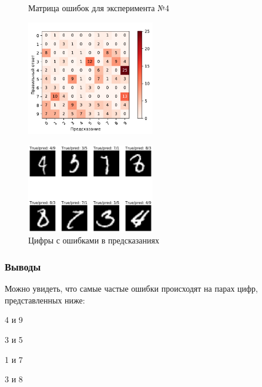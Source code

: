 \documentclass[a4paper, 11pt]{article}
\begin{document}
        \begin{figure}[!h]
            \begin{center}
                \begin{multicols}{2}
                    \caption{Матрица ошибок для эксперимента №4}\label{exp4:conf_matrix}
                    \includegraphics[width=0.5\textwidth, height=3\textheight, keepaspectratio]{../conf_matrix_experiment_4.pdf}
                    \caption{Цифры с ошибками в предсказаниях}\label{exp4:wrong_digits}
                    \vspace{5ex}
                    \includegraphics[width=0.5\textwidth, height=5\textheight, keepaspectratio]{../wrong_digits.pdf}
                \end{multicols}
            \end{center}
        \end{figure}
    
    \subsubsection{Выводы}
    
    Можно увидеть, что самые частые ошибки происходят на парах цифр, представленных ниже:
    \begin{itemize}
        \begin{multicols}{2}
            \item 4 и 9
            \item 3 и 5
            \item 1 и 7
            \item 3 и 8
        \end{multicols}
    \end{itemize}
\end{document}
